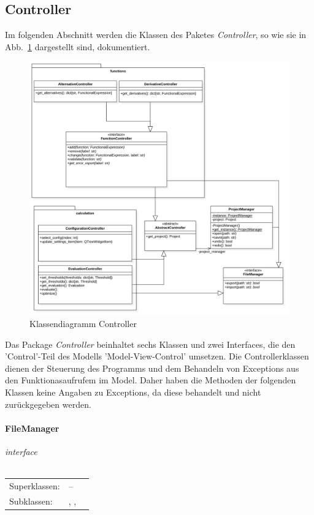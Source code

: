\documentclass{article}
\newcommand{\classheader}[2][]{\paragraph{#2}
\mbox{}\textit{#1}\\\\}
\newcommand{\classref}[1]{\texttt{\nameref{cls:#1}}}
\begin{document}
\subsection{Controller}

Im folgenden Abschnitt werden die Klassen des Paketes \emph{Controller}, so wie sie in Abb.~\ref{fig:ControllerKlassendiagramm} dargestellt sind, dokumentiert.

\begin{figure}[H]%
    \centering
    \includegraphics[width=13cm]{entwurf/Floriane/ControllerKlassendiagramm.png}
    \caption{Klassendiagramm Controller}
    \label{fig:ControllerKlassendiagramm}
\end{figure}

Das Package \textit{Controller} beinhaltet sechs Klassen und zwei Interfaces, die den 'Control'-Teil des Modells 'Model-View-Control' umsetzen. Die Controllerklassen dienen der Steuerung des Programms und dem Behandeln von Exceptions aus den Funktionasaufrufem im Model. Daher haben die Methoden der folgenden Klassen keine Angaben zu Exceptions, da diese behandelt und nicht zurückgegeben werden.

\newpage
\classheader[\flqq{}interface\frqq]{FileManager}\label{cls:FileManager}
\begin{tabular}{lll}
 Superklassen: & --\\
 Subklassen: & \classref{ProjectManager}, \classref{FunctionController}, \classref{EvaluationController}
\end{tabular}\\
\end{document}
